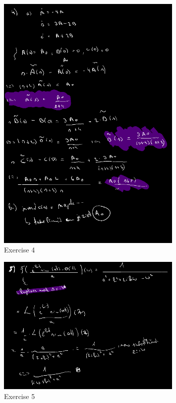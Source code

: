 \documentclass[a4paper]{report}
\begin{document}
\begin{figure}[H]
	\centering
	\includegraphics[width=0.8\textwidth]{assets/bord_12_ex_3.png}
	\caption{Exercise 4}
	\label{fig:bord_12_ex_4}
\end{figure}



\begin{figure}[H]
	\centering
	\includegraphics[width=0.8\textwidth]{assets/bord_12_ex_5.png}
	\caption{Exercise 5}
	\label{fig:bord_12_ex_5}
\end{figure}
\end{document}
